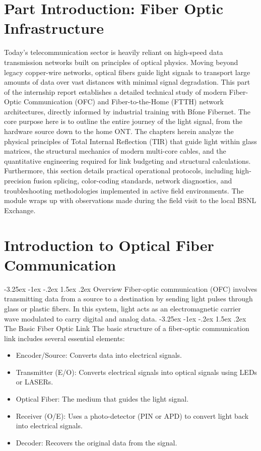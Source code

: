\documentclass[11pt,a4paper]{report}
\makeatletter
\renewcommand{\section}{\@startsection{section}{1}{\z@}%
  {-3.25ex \@plus -1ex \@minus -.2ex}%
  {1.5ex \@plus.2ex}%
  {\normalfont\Large\bfseries\color{primaryColor}}}
\makeatother
\begin{document}
\chapter*{Part Introduction: Fiber Optic Infrastructure}
Today's telecommunication sector is heavily reliant on high-speed data transmission networks built on principles of optical physics. Moving beyond legacy copper-wire networks, optical fibers guide light signals to transport large amounts of data over vast distances with minimal signal degradation. This part of the internship report establishes a detailed technical study of modern Fiber-Optic Communication (OFC) and Fiber-to-the-Home (FTTH) network architectures, directly informed by industrial training with Bfone Fibernet. The core purpose here is to outline the entire journey of the light signal, from the hardware source down to the home ONT. The chapters herein analyze the physical principles of Total Internal Reflection (TIR) that guide light within glass matrices, the structural mechanics of modern multi-core cables, and the quantitative engineering required for link budgeting and structural calculations. Furthermore, this section details practical operational protocols, including high-precision fusion splicing, color-coding standards, network diagnostics, and troubleshooting methodologies implemented in active field environments. The module wraps up with observations made during the field visit to the local BSNL Exchange.
\chapter{Introduction to Optical Fiber Communication}
\section{Overview}
Fiber-optic communication (OFC) involves transmitting data from a source to a destination by sending light pulses through glass or plastic fibers. In this system, light acts as an electromagnetic carrier wave modulated to carry digital and analog data.
\section{The Basic Fiber Optic Link}
The basic structure of a fiber-optic communication link includes several essential elements:
\begin{itemize}
  \item Encoder/Source: Converts data into electrical signals.
  \item Transmitter (E/O): Converts electrical signals into optical signals using LEDs or LASERs.
  \item Optical Fiber: The medium that guides the light signal.
  \item Receiver (O/E): Uses a photo-detector (PIN or APD) to convert light back into electrical signals.
  \item Decoder: Recovers the original data from the signal.
\end{itemize}
\end{document}
